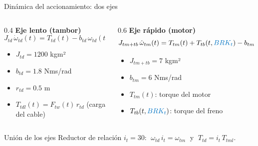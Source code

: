 \begin{frame}{Dinámica del accionamiento: dos ejes}
  \begin{columns}[T]
    \begin{column}{0.4\textwidth}
      \textbf{Eje lento (tambor)}
      \[ J_{td}\,\dot\omega_{td}(t) = T_{td}(t) - b_{td}\,\omega_{td}(t) - T_{tdl}(t) \]
      \begin{itemize}
        \item $J_{td} = 1200$ kgm²
        \item $b_{td} = 1.8$ Nms/rad
        \item $r_{td} = 0.5$ m
        \item $T_{tdl}(t) = F_{tw}(t)\,r_{td}$ (carga del cable)
      \end{itemize}
    \end{column}
    \begin{column}{0.6\textwidth}
      \textbf{Eje rápido (motor)}
      \[ J_{tm+tb}\,\dot\omega_{tm}(t) = T_{tm}(t) + T_{tb}(t,\sig{BRK_t}) - b_{tm}\,\omega_{tm}(t)- T_{tml}(t) \]
      \begin{itemize}
        \item $J_{tm+tb} = 7$ kgm²
        \item $b_{tm} = 6$ Nms/rad
        \item $T_{tm}(t)$: torque del motor
        \item $T_{tb}(t,\sig{BRK_t})$: torque del freno
      \end{itemize}
    \end{column}
  \end{columns}

  \vspace{0.2cm}
  \begin{alertblock}{Unión de los ejes}
    Reductor de relación $i_t = 30$: $\;\omega_{td}\,i_t = \omega_{tm}\;$ y $\;T_{td} = i_t\,T_{tml}$.
  \end{alertblock}
\end{frame}

